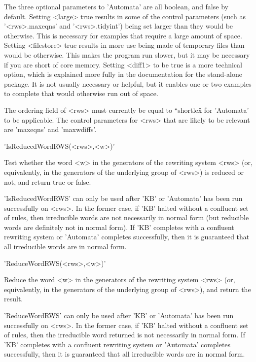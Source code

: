 The three optional parameters to 'Automata' are all boolean, and false
by  default.  Setting  <large>  true results in   some of  the control
parameters (such as  '<rws>.maxeqns'  and '<rws>.tidyint') being   set
larger than they would be   otherwise. This is necessary for  examples
that require a large amount of space. Setting <filestore> true results
in more  use being made  of temporary files  than would  be otherwise.
This makes the program run slower, but it may be  necessary if you are
short of  core memory. Setting <diff1> to  be true is a more technical
option, which is  explained more fully   in the documentation for  the
stand-alone {\KBMAG} package. It is not  usually necessary or helpful,
but it enables  one or two  examples to complete  that would otherwise
run out of space.

The ordering field of <rws> must  currently be equal to {``shortlex\"}
for 'Automata' to be applicable. The control parameters for <rws> that
are likely to be relevant are 'maxeqns' and 'maxwdiffs'.

'IsReducedWordRWS(<rws>,<w>)'

Test  whether the word <w> in  the generators of  the rewriting system
<rws> (or, equivalently, in the generators  of the underlying group of
<rws>) is reduced or not, and return true or false.

'IsReducedWordRWS' can only be used after 'KB'  or 'Automata' has been
run successfully on <rws>. In the former  case, if 'KB' halted without
a  confluent set of rules, then  irreducible words are not necessarily
in  normal form (but  reducible  words are  definitely  not in  normal
form).    If  'KB' completes with    a  confluent rewriting system  or
'Automata' completes  successfully, then  it   is guaranteed that  all
irreducible words are in normal form.

\vspace{5mm}
'ReduceWordRWS(<rws>,<w>)'

Reduce the word  <w> in the generators of  the rewriting system  <rws>
(or, equivalently, in the    generators  of the underlying   group  of
<rws>), and return the result.

'ReduceWordRWS' can only be used after 'KB' or 'Automata' has been run
successfully on <rws>.  In the former case, if  'KB' halted without  a
confluent  set of  rules, then the   irreducible word returned is  not
necessarily in  normal   form.  If 'KB'  completes   with  a confluent
rewriting  system or  'Automata'  completes  successfully, then it  is
guaranteed that all irreducible words are in normal form.

